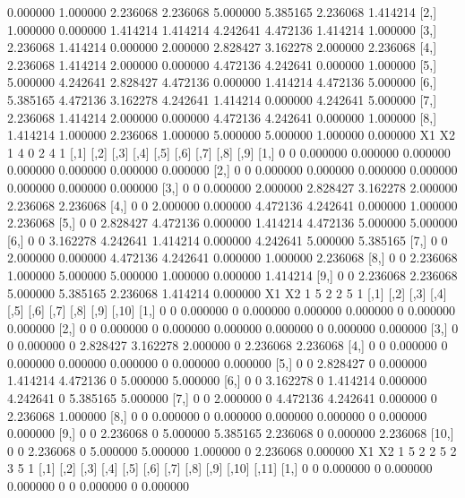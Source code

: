 \documentclass[a4paper]{article}
\begin{document}
\begin{Schunk}
\begin{Soutput}
         [,1]     [,2]     [,3]     [,4]     [,5]     [,6]     [,7]     [,8]
[1,] 0.000000 1.000000 2.236068 2.236068 5.000000 5.385165 2.236068 1.414214
[2,] 1.000000 0.000000 1.414214 1.414214 4.242641 4.472136 1.414214 1.000000
[3,] 2.236068 1.414214 0.000000 2.000000 2.828427 3.162278 2.000000 2.236068
[4,] 2.236068 1.414214 2.000000 0.000000 4.472136 4.242641 0.000000 1.000000
[5,] 5.000000 4.242641 2.828427 4.472136 0.000000 1.414214 4.472136 5.000000
[6,] 5.385165 4.472136 3.162278 4.242641 1.414214 0.000000 4.242641 5.000000
[7,] 2.236068 1.414214 2.000000 0.000000 4.472136 4.242641 0.000000 1.000000
[8,] 1.414214 1.000000 2.236068 1.000000 5.000000 5.000000 1.000000 0.000000
  X1 X2
1  4  0
2  4  1
      [,1] [,2]     [,3]     [,4]     [,5]     [,6]     [,7]     [,8]     [,9]
 [1,]    0    0 0.000000 0.000000 0.000000 0.000000 0.000000 0.000000 0.000000
 [2,]    0    0 0.000000 0.000000 0.000000 0.000000 0.000000 0.000000 0.000000
 [3,]    0    0 0.000000 2.000000 2.828427 3.162278 2.000000 2.236068 2.236068
 [4,]    0    0 2.000000 0.000000 4.472136 4.242641 0.000000 1.000000 2.236068
 [5,]    0    0 2.828427 4.472136 0.000000 1.414214 4.472136 5.000000 5.000000
 [6,]    0    0 3.162278 4.242641 1.414214 0.000000 4.242641 5.000000 5.385165
 [7,]    0    0 2.000000 0.000000 4.472136 4.242641 0.000000 1.000000 2.236068
 [8,]    0    0 2.236068 1.000000 5.000000 5.000000 1.000000 0.000000 1.414214
 [9,]    0    0 2.236068 2.236068 5.000000 5.385165 2.236068 1.414214 0.000000
  X1 X2
1  5  2
2  5  1
      [,1] [,2]     [,3] [,4]     [,5]     [,6]     [,7] [,8]     [,9]    [,10]
 [1,]    0    0 0.000000    0 0.000000 0.000000 0.000000    0 0.000000 0.000000
 [2,]    0    0 0.000000    0 0.000000 0.000000 0.000000    0 0.000000 0.000000
 [3,]    0    0 0.000000    0 2.828427 3.162278 2.000000    0 2.236068 2.236068
 [4,]    0    0 0.000000    0 0.000000 0.000000 0.000000    0 0.000000 0.000000
 [5,]    0    0 2.828427    0 0.000000 1.414214 4.472136    0 5.000000 5.000000
 [6,]    0    0 3.162278    0 1.414214 0.000000 4.242641    0 5.385165 5.000000
 [7,]    0    0 2.000000    0 4.472136 4.242641 0.000000    0 2.236068 1.000000
 [8,]    0    0 0.000000    0 0.000000 0.000000 0.000000    0 0.000000 0.000000
 [9,]    0    0 2.236068    0 5.000000 5.385165 2.236068    0 0.000000 2.236068
[10,]    0    0 2.236068    0 5.000000 5.000000 1.000000    0 2.236068 0.000000
  X1 X2
1  5  2
2  5  2
3  5  1
      [,1] [,2]     [,3] [,4]     [,5]     [,6] [,7] [,8]     [,9] [,10]    [,11]
 [1,]    0    0 0.000000    0 0.000000 0.000000    0    0 0.000000     0 0.000000

\end{Soutput}
\end{Schunk}
\end{document}
